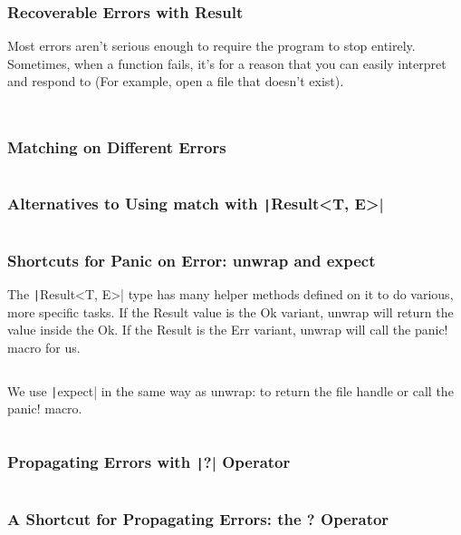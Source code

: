\documentclass{beamer}
\begin{document}
\begin{frame}[fragile]
	\frametitle{Recoverable Errors with Result}
	Most errors aren’t serious enough to require the program to stop entirely. Sometimes, when a function fails, it’s for a reason that you can easily interpret and respond to (For example, open a file that doesn’t exist).
	
	\scriptsize
	
	\inputminted[fontsize=\scriptsize]{rust}{./code/result.rs}
	
	\inputminted[fontsize=\scriptsize]{rust}{./code/result2.rs}
\end{frame}


\begin{frame}[fragile]
	\frametitle{Matching on Different Errors}

	\inputminted[fontsize=\scriptsize]{rust}{./code/result3.rs}
\end{frame}


\begin{frame}[fragile]
	\frametitle{Alternatives to Using match with \texttt|Result<T, E>| }
	
	\inputminted[fontsize=\scriptsize]{rust}{./code/result4.rs}
\end{frame}

\begin{frame}[fragile]
	\frametitle{Shortcuts for Panic on Error: unwrap and expect }
	\scriptsize
   The \texttt|Result<T, E>| type has many helper methods defined on it to do various, more specific tasks. If the Result value is the Ok variant, unwrap will return the value inside the Ok. If the Result is the Err variant, unwrap will call the panic! macro for us.
   
	\inputminted[fontsize=\scriptsize]{rust}{./code/result5.rs}
	
	We use  \texttt|expect| in the same way as unwrap: to return the file handle or call the panic! macro.
	
	\inputminted[fontsize=\scriptsize]{rust}{./code/result6.rs}
\end{frame}



\begin{frame}[fragile]
	\frametitle{Propagating Errors with  \texttt|?| Operator}
	\inputminted{rust}{./code/result8.rs}
\end{frame}

\begin{frame}[fragile]
	\frametitle{A Shortcut for Propagating Errors: the ? Operator}
	\inputminted{rust}{./code/result7.rs}
\end{frame}
\end{document}
